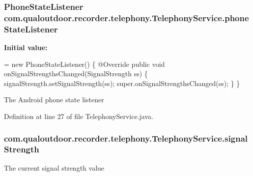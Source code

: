 \hypertarget{classcom_1_1qualoutdoor_1_1recorder_1_1telephony_1_1TelephonyService_a506be3a4dee76693c315a0e377c506e5}{
\subsubsection[{phone\-State\-Listener}]{\setlength{\rightskip}{0pt plus 5cm}Phone\-State\-Listener com.\-qualoutdoor.\-recorder.\-telephony.\-Telephony\-Service.\-phone\-State\-Listener\hspace{0.3cm}{\ttfamily [private]}}}\label{classcom_1_1qualoutdoor_1_1recorder_1_1telephony_1_1TelephonyService_a506be3a4dee76693c315a0e377c506e5}
{\bfseries Initial value\-:}
\begin{DoxyCode}
= \textcolor{keyword}{new} PhoneStateListener() \{        
        @Override
        \textcolor{keyword}{public} \textcolor{keywordtype}{void} onSignalStrengthsChanged(SignalStrength ss) \{
            signalStrength.setSignalStrength(ss);
            super.onSignalStrengthsChanged(ss);
        \}
    \}
\end{DoxyCode}
The Android phone state listener 

Definition at line 27 of file Telephony\-Service.\-java.

\hypertarget{classcom_1_1qualoutdoor_1_1recorder_1_1telephony_1_1TelephonyService_a52b73496a64d8a0b34d3635a76c5aadf}{
\subsubsection[{signal\-Strength}]{ com.\-qualoutdoor.\-recorder.\-telephony.\-Telephony\-Service.\-signal\-Strength\hspace{0.3cm}{\ttfamily [private]}}}\label{classcom_1_1qualoutdoor_1_1recorder_1_1telephony_1_1TelephonyService_a52b73496a64d8a0b34d3635a76c5aadf}
The current signal strength value 

